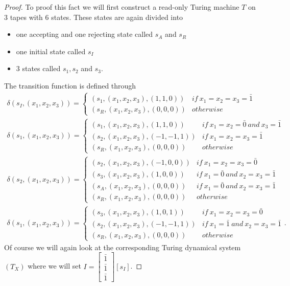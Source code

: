 \documentclass[12pt,a4paper]{scrartcl}
\theoremstyle{plain}
\theoremstyle{definition}
\numberwithin{equation}{section}
\newcommand{\2}{\mathbb{Z} / 2 \mathbb{Z}}
\newcommand{\1}{\bar{1}}
\newcommand{\0}{\bar{0}}
\begin{document}
\begin{proof}
	To proof this fact we will first construct a read-only Turing machine $T$ on $3$ tapes with $6$ states. These states are again divided into
	\begin{itemize}
		\item one accepting and one rejecting state called $s_A$ and $s_R$
		\item one initial state called $s_I$
		\item $3$ states called $s_1, s_2$ and $s_3$.
	\end{itemize}
	The transition function is defined through
	\begin{align*}
		\delta(s_I, (x_1, x_2, x_3)) = \begin{cases}
			(s_1, (x_1, x_2, x_3), (1, 1, 0)) & if \ x_1 = x_2 = x_3 = \1 \\
			(s_R, (x_1, x_2, x_3), (0, 0, 0)) & otherwise
		\end{cases} \\
		\delta(s_1, (x_1, x_2, x_3)) = \begin{cases}
		(s_1, (x_1, x_2, x_3), (1, 1, 0)) & if \ x_1 = x_2 = \0 \ and \ x_3 = \1 \\
		(s_2, (x_1, x_2, x_3), (-1, -1, 1)) & if \ x_1 = x_2 = x_3 = \1 \\
		(s_R, (x_1, x_2, x_3), (0, 0, 0)) & otherwise
		\end{cases} \\
		\delta(s_2, (x_1, x_2, x_3)) = \begin{cases}
		(s_2, (x_1, x_2, x_3), (-1, 0, 0)) & if \ x_1 = x_2 = x_3 = \0  \\
		(s_3, (x_1, x_2, x_3), (1, 0, 0)) & if \ x_1 = \0 \ and \ x_2 = x_3 = \1 \\
		(s_A, (x_1, x_2, x_3), (0, 0, 0)) & if \ x_1 = \0 \ and \ x_2 = x_3 = \1  \\ 
		(s_R, (x_1, x_2, x_3), (0, 0, 0)) & otherwise
		\end{cases} \\
		\delta(s_1, (x_1, x_2, x_3)) = \begin{cases}
		(s_3, (x_1, x_2, x_3), (1, 0, 1)) & if \ x_1 = x_2 = x_3 = \0 \\
		(s_2, (x_1, x_2, x_3), (-1, -1, 1)) & if \ x_1 = \1 \ and \ x_2 = x_3 = \1 \\
		(s_R, (x_1, x_2, x_3), (0, 0, 0)) & otherwise
		\end{cases}.
	\end{align*}
	Of course we will again look at the corresponding Turing dynamical system $(T_X)$ where we will set $I = \begin{bmatrix}
	\1 \\
	\1 \\
	\1 
	\end{bmatrix}[s_I]$.
	

\end{proof}
\end{document}
